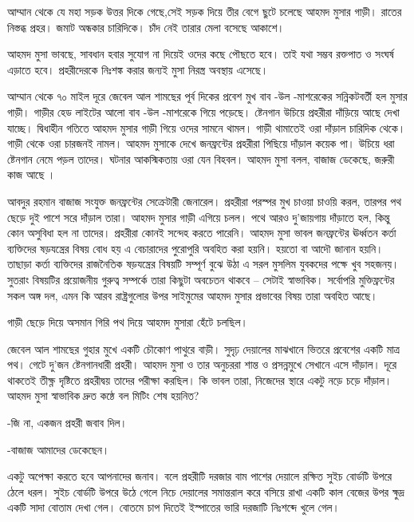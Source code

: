 \documentclass[
]{book}
\begin{document}
আম্মান থেকে যে মহা সড়ক উত্তর দিকে গেছে,সেই সড়ক দিয়ে তীর বেগে ছুটে চলেছে আহমদ মুসার গাড়ী। রাতের নিস্তব্ধ প্রহর। জমাট অন্ধকার চারিদিকে। চাঁদ নেই তারার মেলা বসেছে আকাশে।

আহমদ মুসা ভাবছে, সাবধান হবার সুযোগ না দিয়েই ওদের কছে পৌছতে হবে। তাই যথা সম্ভব রক্তপাত ও সংঘর্ষ এড়াতে হবে। প্রহরীদেরকে নিঃশঙ্ক করার জন্যই মুসা নিরস্ত্র অবস্থায় এসেছে।

আম্মান থেকে ৭০ মাইল দূরে জেবেল আল শামছের পূর্ব দিকের প্রবেশ মুখ বাব -উল -মাশরেকের সন্নিকটবর্তী হল মুসার গাড়ী। গাড়ীর হেড লাইটের আলো বাব -উল -মাশরেকে গিয়ে পড়েছে। ষ্টেনগান উচিয়ে প্রহরীরা দাঁড়িয়ে আছে দেখা যাচ্ছে। দ্বিধাহীন গতিতে আহমদ মুসার গাড়ী গিয়ে ওদের সামনে থামল। গাড়ী থামাতেই ওরা দাঁড়াল চারিদিক থেকে। গাড়ী থেকে ওরা চারজনই নামল। আহমদ মুসাকে দেখে জনফ্রন্টের প্রহরীরা পিছিয়ে দাঁড়াল কয়েক পা। উচিয়ে ধরা ষ্টেনগান নেমে পড়ল তাদের। ঘটনার আকস্মিকতায় ওরা যেন বিহবল। আহমদ মুসা বলল, বাজাজ ডেকেছে, জরুরী কাজ আছে ।

আবদুর রহমান বাজাজ সংযুক্ত জনফ্রন্টের সেক্রেটারী জেনারেল। প্রহরীরা পরস্পর মুখ চাওয়া চাওয়ি করল, তারপর পথ ছেড়ে দুই পাশে সরে দাঁড়াল তারা। আহমদ মুসার গাড়ী এগিয়ে চলল। পথে আরও দু'জায়গায় দাঁড়াতে হল, কিন্তু কোন অসুবিধা হল না তাদের। প্রহরীরা কোনই সন্দেহ করতে পারেনি। আহমদ মুসা ভাবল জনফ্রন্টের ঊর্ধ্বতন কর্তা ব্যক্তিদের ষড়যন্ত্রের বিষয় বোধ হয় এ বেচারাদের পুরোপুরি অবহিত করা হয়নি। হয়তো বা আদৌ জানান হয়নি। তাছাড়া কর্তা ব্যক্তিদের রাজনৈতিক ষড়যন্ত্রের বিষয়টি সম্পূর্ণ বুঝে উঠা এ সরল মুসলিম যুবকদের পক্ষে খুব সহজনয়। সুতরাং বিষয়টির প্রয়োজনীয় গুরুত্ব সম্পর্কে তারা কিছুটা অবচেতন থাকবে -- সেটাই স্বাভাবিক। সর্বোপরি মুক্তিফ্রন্টের সকল অঙ্গ দল, এমন কি আরব রাষ্ট্রগুলোর উপর সাইমুমের আহমদ মুসার প্রভাবের বিষয় তারা অবহিত আছে।

গাড়ী ছেড়ে দিয়ে অসমান গিরি পথ দিয়ে আহমদ মুসারা হেঁটে চলছিল।

জেবেল আল শামছের গুহার মুখে একটি চৌকোণ পাথুরে বাড়ী। সুদৃঢ় দেয়ালের মাঝখানে ভিতরে প্রবেশের একটি মাত্র পথ। গেটে দু'জন ষ্টেনগানধারী প্রহরী। আহমদ মুসা ও তার অনুচররা শান্ত ও প্রসন্নমুখে সেখানে এসে দাঁড়াল। দূরে থাকতেই তীক্ষ্ণ দৃষ্টিতে প্রহরীদ্বয় তাদের পরীক্ষা করছিল। কি ভাবল তারা, নিজেদের স্থারে একটু নড়ে চড়ে দাঁড়াল। আহমদ মুসা স্বাভাবিক দ্রুত কন্ঠে বল মিটিং শেষ হয়নিত?

-জি না, একজন প্রহরী জবাব দিল।

-বাজাজ আমাদের ডেকেছেন।

একটু অপেক্ষা করতে হবে আপনাদের জনাব। বলে প্রহরীটি দরজার বাম পাশের দেয়ালে রক্ষিত সুইচ বোর্ডটি উপরে ঠেলে ধরল। সুইচ বোর্ডটি উপরে উঠে গেলে নিচে দেয়ালের সমান্তরাল করে বসিয়ে রাখা একটি কাল বেজের উপর ক্ষুদ্র একটি সাদা বোতাম দেখা গেল। বোতমে চাপ দিতেই ইস্পাতের ভারি দরজাটি নিঃশব্দে খুলে গেল।
\end{document}
